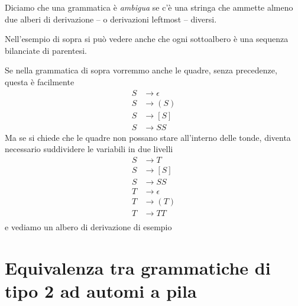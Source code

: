 \documentclass[12pt]{report}
\begin{document}
Diciamo che una grammatica è \textit{ambigua} se c'è una stringa che ammette almeno due alberi di derivazione -- o derivazioni leftmost -- diversi.

Nell'esempio di sopra si può vedere anche che ogni sottoalbero è una sequenza bilanciate di parentesi.

\begin{tcolorbox} %
Se nella grammatica di sopra vorremmo anche le quadre, senza precedenze, questa è facilmente
\begin{align*}
 	S &\rightarrow \epsilon \\
 	S &\rightarrow ( S ) \\
 	S &\rightarrow [ S ] \\
 	S &\rightarrow S S
\end{align*}
Ma se si chiede che le quadre non possano stare all'interno delle tonde, diventa necessario suddividere le variabili in due livelli
\begin{align*}
 	S &\rightarrow T \\
 	S &\rightarrow [ S ] \\
 	S &\rightarrow S S \\
 	T &\rightarrow \epsilon \\
 	T &\rightarrow ( T ) \\
 	T &\rightarrow T T \\
\end{align*}
e vediamo un albero di derivazione di esempio
\begin{center}
\end{center}
\end{tcolorbox}


\section{Equivalenza tra grammatiche di tipo 2 ad automi a pila}
\end{document}
